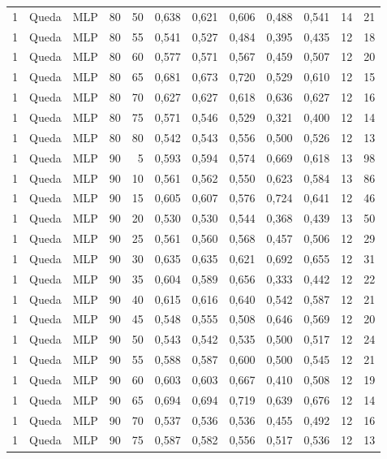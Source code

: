 \begin{longtable}{@{}rllrrrrrrrrr@{}}
1 & Queda & MLP & 80 & 50 & 0,638 & 0,621 & 0,606 & 0,488 & 0,541 & 14 & 21 \\
1 & Queda & MLP & 80 & 55 & 0,541 & 0,527 & 0,484 & 0,395 & 0,435 & 12 & 18 \\
1 & Queda & MLP & 80 & 60 & 0,577 & 0,571 & 0,567 & 0,459 & 0,507 & 12 & 20 \\
1 & Queda & MLP & 80 & 65 & 0,681 & 0,673 & 0,720 & 0,529 & 0,610 & 12 & 15 \\
1 & Queda & MLP & 80 & 70 & 0,627 & 0,627 & 0,618 & 0,636 & 0,627 & 12 & 16 \\
1 & Queda & MLP & 80 & 75 & 0,571 & 0,546 & 0,529 & 0,321 & 0,400 & 12 & 14 \\
1 & Queda & MLP & 80 & 80 & 0,542 & 0,543 & 0,556 & 0,500 & 0,526 & 12 & 13 \\
1 & Queda & MLP & 90 & 5 & 0,593 & 0,594 & 0,574 & 0,669 & 0,618 & 13 & 98 \\
1 & Queda & MLP & 90 & 10 & 0,561 & 0,562 & 0,550 & 0,623 & 0,584 & 13 & 86 \\
1 & Queda & MLP & 90 & 15 & 0,605 & 0,607 & 0,576 & 0,724 & 0,641 & 12 & 46 \\
1 & Queda & MLP & 90 & 20 & 0,530 & 0,530 & 0,544 & 0,368 & 0,439 & 13 & 50 \\
1 & Queda & MLP & 90 & 25 & 0,561 & 0,560 & 0,568 & 0,457 & 0,506 & 12 & 29 \\
1 & Queda & MLP & 90 & 30 & 0,635 & 0,635 & 0,621 & 0,692 & 0,655 & 12 & 31 \\
1 & Queda & MLP & 90 & 35 & 0,604 & 0,589 & 0,656 & 0,333 & 0,442 & 12 & 22 \\
1 & Queda & MLP & 90 & 40 & 0,615 & 0,616 & 0,640 & 0,542 & 0,587 & 12 & 21 \\
1 & Queda & MLP & 90 & 45 & 0,548 & 0,555 & 0,508 & 0,646 & 0,569 & 12 & 20 \\
1 & Queda & MLP & 90 & 50 & 0,543 & 0,542 & 0,535 & 0,500 & 0,517 & 12 & 24 \\
1 & Queda & MLP & 90 & 55 & 0,588 & 0,587 & 0,600 & 0,500 & 0,545 & 12 & 21 \\
1 & Queda & MLP & 90 & 60 & 0,603 & 0,603 & 0,667 & 0,410 & 0,508 & 12 & 19 \\
1 & Queda & MLP & 90 & 65 & 0,694 & 0,694 & 0,719 & 0,639 & 0,676 & 12 & 14 \\
1 & Queda & MLP & 90 & 70 & 0,537 & 0,536 & 0,536 & 0,455 & 0,492 & 12 & 16 \\
1 & Queda & MLP & 90 & 75 & 0,587 & 0,582 & 0,556 & 0,517 & 0,536 & 12 & 13 \\

\end{longtable}
